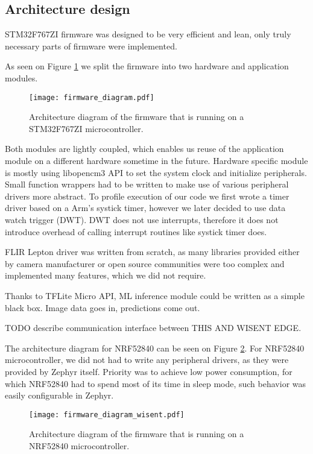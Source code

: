 \subsection{ Architecture design}

STM32F767ZI firmware was designed to be very efficient and lean, only truly necessary parts of firmware were implemented.

As seen on Figure \ref{firmware_diagram} we split the firmware into two hardware and application modules.

\begin{figure}[ht]
        \centering
        \texttt{[image: firmware\_diagram.pdf]} 
        \caption{ Architecture diagram of the firmware that is running on a STM32F767ZI microcontroller.} 
        \label{firmware_diagram}
\end{figure}

Both modules are lightly coupled, which enables us reuse of the application module on a different hardware sometime in the future.
Hardware specific module is mostly using libopencm3 API to set the system clock and initialize peripherals.
Small function wrappers had to be written to make use of various peripheral drivers more abstract.
To profile execution of our code we first wrote a timer driver based on a Arm's systick timer, however we later decided to use data watch trigger (DWT).
DWT does not use interrupts, therefore it does not introduce overhead of calling interrupt routines like systick timer does.

FLIR Lepton driver was written from scratch, as many libraries provided either by camera manufacturer or open source communities were too complex and implemented many features, which we did not require.

Thanks to TFLite Micro API, ML inference module could be written as a simple black box.
Image data goes in, predictions come out.

TODO describe communication interface between THIS AND WISENT EDGE.


The architecture diagram for NRF52840 can be seen on Figure \ref{firmware_diagram_wisent}.
For NRF52840 microcontroller, we did not had to write any peripheral drivers, as they were provided by Zephyr itself.
Priority was to achieve low power consumption, for which NRF52840 had to spend most of its time in sleep mode, such behavior was easily configurable in Zephyr.

\begin{figure}[ht]
        \centering
        \texttt{[image: firmware\_diagram\_wisent.pdf]} 
        \caption{ Architecture diagram of the firmware that is running on a NRF52840 microcontroller.} 
        \label{firmware_diagram_wisent}
\end{figure}

